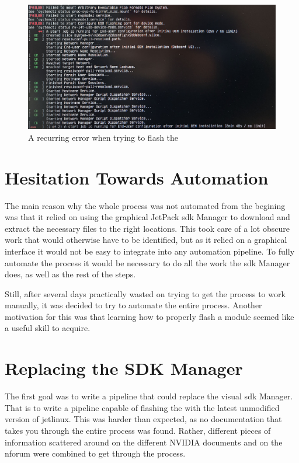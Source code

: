 \begin{figure}[H]
    \centering
    \includegraphics[width=1\textwidth]{figures/stuck_in_boot_loop.jpg}
    \caption{A recurring error when trying to flash the \jx}
    \label{fig:stuck_in_boot_loop}
\end{figure}

\section{Hesitation Towards Automation}
The main reason why the whole process was not automated from the begining was that it relied on using the graphical JetPack \gls{sdk} Manager to download and extract the necessary files to the right locations.
This took care of a lot obscure work that would otherwise have to be identified, but as it relied on a graphical interface it would not be easy to integrate into any automation pipeline.
To fully automate the process it would be necessary to do all the work the \gls{sdk} Manager does, as well as the rest of the steps.

Still, after several days practically wasted on trying to get the process to work manually, it was decided to try to automate the entire process.
Another motivation for this was that learning how to properly flash a \jetson module seemed like a useful skill to acquire.

\section{Replacing the SDK Manager}
The first goal was to write a pipeline that could replace the visual \gls{sdk} Manager.
That is to write a pipeline capable of flashing the \jx with the latest unmodified version of \gls{jetlinux}.
This was harder than expected, as no documentation that takes you through the entire process was found.
Rather, different pieces of information scattered around on the different NVIDIA documents and on the \gls{nforum} were combined to get through the process.


